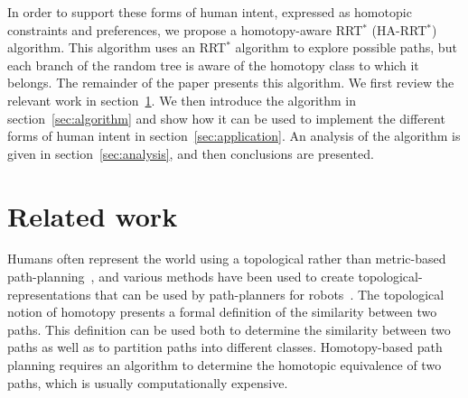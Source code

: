 \documentclass[letterpaper, 10 pt, conference]{ieeeconf}
\begin{document}
In order to support these forms of human intent, expressed as homotopic constraints and preferences, we propose a homotopy-aware RRT$^{*}$ (HA-RRT$^{*}$) algorithm. 
This algorithm uses an RRT$^*$ algorithm to explore possible paths, but each branch of the random tree is aware of the homotopy class to which it belongs. 
The remainder of the paper presents this algorithm. We first review the relevant work in section~\ref{sec:related_work}.
We then introduce the algorithm in section~\ref{sec:algorithm} and show how it can be used to implement the different forms of human intent in section~\ref{sec:application}. 
An analysis of the algorithm is given in section~\ref{sec:analysis}, and then conclusions are presented.

\section{Related work}
\label{sec:related_work}

Humans often represent the world using a topological rather than metric-based path-planning~\cite{kuipers99,aginsky1997two}, and various methods have been used to create topological-representations that can be used by path-planners for robots~\cite{mataric1992integration,thrun1998learning,fasola2013modeling,shah2013qualitative}.  
The topological notion of homotopy presents a formal definition of the similarity between two paths.
This definition can be used both to determine the similarity between two paths as well as to partition paths into different classes.
Homotopy-based path planning requires an algorithm to determine the homotopic equivalence of two paths, which is usually computationally expensive.

\end{document}
